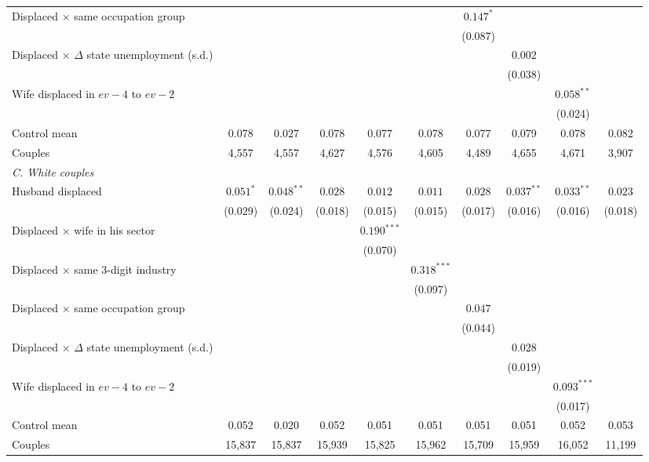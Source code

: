 \begin{table}[htbp]
{\begin{tabular}{lccccccccc}
Displaced $\times$ same occupation group &  &  &  &  &  & $0.147^{*}$ &  &  &  \\
 &  &  &  &  &  & (0.087) &  &  &  \\
Displaced $\times$ $\Delta$ state unemployment (s.d.) &  &  &  &  &  &  & $0.002$ &  &  \\
 &  &  &  &  &  &  & (0.038) &  &  \\
Wife displaced in $ev-4$ to $ev-2$ &  &  &  &  &  &  &  & $0.058^{**}$ &  \\
 &  &  &  &  &  &  &  & (0.024) &  \\
Control mean & 0.078 & 0.027 & 0.078 & 0.077 & 0.078 & 0.077 & 0.079 & 0.078 & 0.082 \\
Couples & 4,557 & 4,557 & 4,627 & 4,576 & 4,605 & 4,489 & 4,655 & 4,671 & 3,907 \\
\multicolumn{10}{l}{\textit{C. White couples}} \\
Husband displaced & $0.051^{*}$ & $0.048^{**}$ & $0.028$ & $0.012$ & $0.011$ & $0.028$ & $0.037^{**}$ & $0.033^{**}$ & $0.023$ \\
 & (0.029) & (0.024) & (0.018) & (0.015) & (0.015) & (0.017) & (0.016) & (0.016) & (0.018) \\
Displaced $\times$ wife in his sector &  &  &  & $0.190^{***}$ &  &  &  &  &  \\
 &  &  &  & (0.070) &  &  &  &  &  \\
Displaced $\times$ same 3-digit industry &  &  &  &  & $0.318^{***}$ &  &  &  &  \\
 &  &  &  &  & (0.097) &  &  &  &  \\
Displaced $\times$ same occupation group &  &  &  &  &  & $0.047$ &  &  &  \\
 &  &  &  &  &  & (0.044) &  &  &  \\
Displaced $\times$ $\Delta$ state unemployment (s.d.) &  &  &  &  &  &  & $0.028$ &  &  \\
 &  &  &  &  &  &  & (0.019) &  &  \\
Wife displaced in $ev-4$ to $ev-2$ &  &  &  &  &  &  &  & $0.093^{***}$ &  \\
 &  &  &  &  &  &  &  & (0.017) &  \\
Control mean & 0.052 & 0.020 & 0.052 & 0.051 & 0.051 & 0.051 & 0.051 & 0.052 & 0.053 \\
Couples & 15,837 & 15,837 & 15,939 & 15,825 & 15,962 & 15,709 & 15,959 & 16,052 & 11,199 \\
\bottomrule
\end{tabular}}

\end{table}
